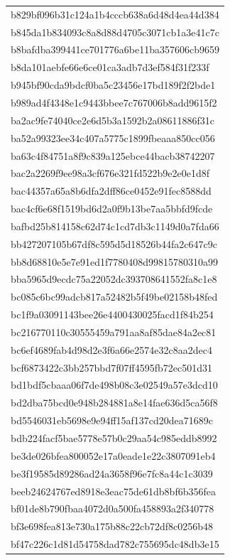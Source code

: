 \begin{tabular}{l}
b829bf096b31c124a1b4cccb638a6d48d4ea44d384 \\
b845da1b834093c8a8d88d4705c3071cb1a3e41c7c \\
b8bafdba399441ce701776a6be11ba357606cb9659 \\
b8da101aebfe66e6ce01ca3adb7d3ef584f31f233f \\
b945bf90cda9bdcf0ba5c23456e17bd189f2f2bde1 \\
b989ad4f4348e1c9443bbee7c767006b8add9615f2 \\
ba2ac9fe74040ce2e6d5b3a1592b2a08611886f31c \\
ba52a99323ee34c407a5775c1899fbeaaa850cc056 \\
ba63c4f84751a8f9c839a125ebce44bacb38742207 \\
bac2a2269f9ee98a3cf676e321fd522b9e2e0e1d8f \\
bac44357a65a8b6dfa2dff86ce0452e91fec8588dd \\
bac4cf6e68f1519bd6d2a0f9b13be7aa5bbfd9fcde \\
bafbd25b814158c62d74c1cd7db3c1149d0a7fda66 \\
bb427207105b67df8c595d5d18526b44fa2c647c9c \\
bb8d68810e5e7e91ed1f7780408d99815780310a99 \\
bba5965d9ecdc75a22052dc393708641552fa8c1e8 \\
bc085c6bc99adcb817a52482b5f49be02158b48fed \\
bc1f9a03091143bee26e4400430025facd1f84b254 \\
bc216770110c30555459a791aa8af85dae84a2ec81 \\
bc6ef4689fab4d98d2e3f6a66e2574e32c8aa2dec4 \\
bcf6873422c3bb257bbd7f07ff4595fb72ec501d31 \\
bd1bdf5cbaaa06f7de498b08c3e02549a57e3dcd10 \\
bd2dba75bcd0e948b284881a8e14fae636d5ca56f8 \\
bd5546031eb5698e9e94ff15af137cd20dea71689c \\
bdb224facf5bae5778e57b0c29aa54c985eddb8992 \\
be3de026bfea800052e17a0eade1e22c3807091eb4 \\
be3f19585d89286ad24a3658f96e7fc8a44c1c3039 \\
beeb24624767ed8918e3eac75de61db8bf6b356fea \\
bf01de8b790fbaa4072d0a500fa458893a2f340778 \\
bf3e698fea813e730a175b88c22cb72df8c0256b48 \\
bf47c226c1d81d54758dad782c755695dc48db3e15 \\

\end{tabular}
